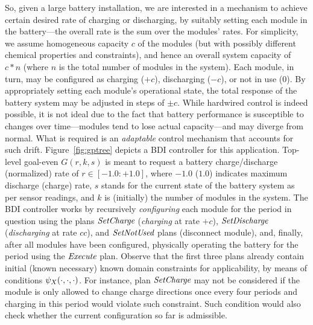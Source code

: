 So, given a large battery installation, we are interested in a mechanism to achieve certain desired rate of charging or discharging, by suitably setting each module in the battery---the overall rate is the sum over the modules' rates.  
For simplicity, we assume homogeneous capacity $c$ of the modules (but with possibly different chemical properties and constraints), and hence an overall system capacity of $c*n$ (where $n$ is the total number of modules in the system). Each module, in turn, may be configured as charging ($+c$), discharging ($-c$), or not in use ($0$). By appropriately setting each module's operational state, the total response of the battery system may be adjusted in steps of $\pm c$.
While hardwired control is indeed possible, it is not ideal due to the fact that battery performance is susceptible to changes over time---modules tend to lose actual capacity---and may diverge from normal. 
What is required is an \emph{adaptable} control mechanism that accounts for such drift. 
Figure~\ref{fig:gptree} depicts a BDI controller for this application. Top-level goal-even $G(r,k,s)$ is meant to request a battery charge/discharge (normalized) rate of $r \in [-1.0:+1.0]$, where $-1.0$ ($1.0$) indicates maximum discharge (charge) rate, $s$ stands for the current state of the battery system as per sensor readings, and $k$ is (initially) the number of modules in the system. 
The BDI controller works by recursively \emph{configuring} each module for the period in question using the plans $\operatorname{\textit{SetCharge}}$ (\emph{charging} at rate $+c$), $\operatorname{\textit{SetDischarge}}$ (\emph{discharging} at rate $cc$), and $\operatorname{\textit{SetNotUsed}}$ plans (disconnect module), and, finally, after all modules have been configured, physically operating the battery for the period using the $\operatorname{\textit{Execute}}$ plan. 
Observe that the first three plans already contain initial (known necessary) known domain constraints for applicability, by means of conditions $\psi_X(\cdot,\cdot,\cdot)$. For instance, plan $\operatorname{\textit{SetCharge}}$ may not be considered if the module is only allowed to change charge directions once every four periods and charging in this period would violate such constraint. Such condition would also check whether the current configuration so far is admissible.
